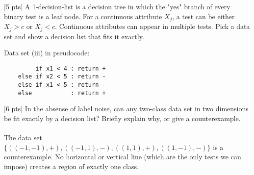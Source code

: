 \begin{question}{}
  [5 pts] A 1-decision-list is a decision tree in which the "yes" branch of every binary test is a leaf node. For a continuous attribute $X_j$, a test can be either $X_j > c$ or $X_j < c$. Continuous attributes can appear in multiple tests. Pick a data set and show a decision list that fits it exactly.
\end{question}
\begin{minipage}{\textwidth}
    \solution{} { 
    Data set (iii) in pseudocode: \begin{verbatim}
         if x1 < 4 : return +
    else if x2 < 5 : return -
    else if x1 < 5 : return -
    else           : return +
    \end{verbatim}
    }
\end{minipage}

\begin{question}{}
  [6 pts] In the absense of label noise, can any two-class data set in two dimensions be fit exactly by a decision list? Briefly explain why, or give a counterexample.
\end{question}
\begin{minipage}{\textwidth}
    \solution{} {
    \paragraph{} The data set $\{((-1,-1),+),((-1,1),-),((1,1),+),((1,-1),-)\}$ is a counterexample. No horizontal or vertical line (which are the only tests we can impose) creates a region of exactly one class.
    }
\end{minipage}


